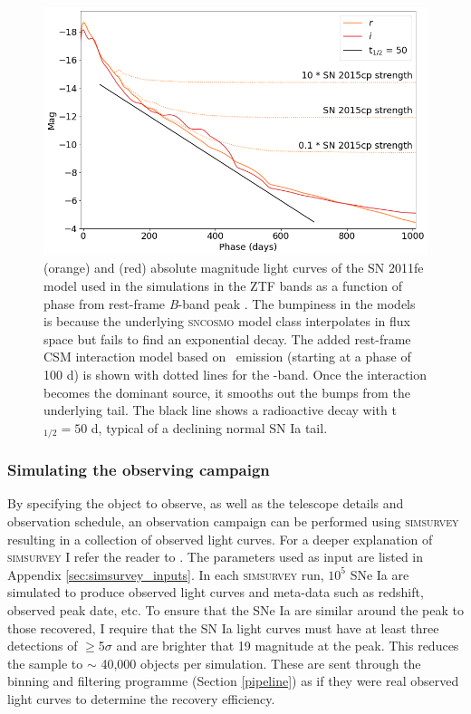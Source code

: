 \documentclass[a4paper,oneside,12pt, class=Latex/Classes/PhDthesisPSnPDF, crop=false]{standalone}
\begin{document}
\begin{figure}
 \centering
 \includegraphics[width=\textwidth]{../Images/chapter_3/11fe_mods.png}
 \caption{\ztfr (orange) and \ztfi (red) absolute magnitude light curves of the SN 2011fe model used in the simulations in the ZTF bands as a function of phase from rest-frame \textit{B}-band peak \citep{spec_HST}. The bumpiness in the models is because the underlying \textsc{sncosmo} model class interpolates in flux space but fails to find an exponential decay. The added rest-frame CSM interaction model based on \Halpha~emission (starting at a phase of 100 d) is shown with dotted lines for the \ztfr-band. Once the interaction becomes the dominant source, it smooths out the bumps from the underlying tail. The black line shows a radioactive decay with t$_{1/2}=50$ d, typical of a declining normal SN Ia tail.}
 \label{11fe_mods}
\end{figure}

\subsubsection{Simulating the observing campaign}
\label{sim_obs}
By specifying the object to observe, as well as the telescope details and observation schedule, an observation campaign can be performed using \textsc{simsurvey} resulting in a collection of observed light curves. For a deeper explanation of \textsc{simsurvey} I refer the reader to \cite{simsurvey_main}. The parameters used as input are listed in Appendix \ref{sec:simsurvey_inputs}. In each \textsc{simsurvey} run, $10^5$ SNe Ia are simulated to produce observed light curves and meta-data such as redshift, observed peak date, etc. To ensure that the SNe Ia are similar around the peak to those recovered, I require that the SN Ia light curves must have at least three detections of $\geq$5$\sigma$ and are brighter that 19 magnitude at the peak. This reduces the sample to $\sim$ 40,000 objects per simulation. These are sent through the binning and filtering programme (Section \ref{pipeline}) as if they were real observed light curves to determine the recovery efficiency. 
\end{document}
